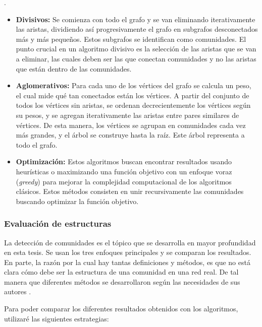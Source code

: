 \begin{enumerate}
.
\begin{itemize}
\item \textbf{Divisivos:} Se comienza con todo el grafo y se van eliminando iterativamente las aristas, dividiendo así progresivamente el grafo en subgrafos desconectados más y más pequeños. Estos subgrafos se identifican como comunidades. El punto crucial en un algoritmo divisivo es la selección de las aristas que se van a eliminar, las cuales deben ser las que conectan comunidades y no las aristas que están dentro de las comunidades. \cite{Radicchi2004DefiningNetworks,Girvan2002CommunityNetworks.,Newman2004FastNetworks}
\item \textbf{Aglomerativos:} Para cada uno de los vértices del grafo se calcula un peso, el cual mide qué tan conectados están los vértices. A partir del conjunto de todos los vértices sin aristas, se ordenan decrecientemente los vértices según su pesos, y se agregan iterativamente las aristas entre pares similares de vértices. De esta manera, los vértices se agrupan en comunidades cada vez más grandes, y el árbol se construye hasta la raíz. Este árbol representa a todo el grafo. \cite{Radicchi2004DefiningNetworks,Pons2005ComputingWalks}
\item \textbf{Optimización:} Estos algoritmos buscan encontrar resultados usando heurísticas o maximizando una función objetivo con un enfoque voraz (\textit{greedy}) para mejorar la complejidad computacional de los algoritmos clásicos. Estos métodos consisten en unir recursivamente las comunidades buscando optimizar la función objetivo.\cite{Clauset2004FindingNetworks,Blondel2008FastNetworks}
\end{itemize}
  
\end{enumerate}

\subsubsection{Evaluación de estructuras}
La detección de comunidades es el tópico que se desarrolla en mayor profundidad en esta tesis. Se usan los tres enfoques principales y se comparan los resultados. En parte, la razón por la cual hay tantas definiciones y métodos, es que no está clara cómo debe ser la estructura de una comunidad en una red real. De tal manera que diferentes métodos se desarrollaron según las necesidades de sus autores \cite{Tang2010}.

Para poder comparar los diferentes resultados obtenidos con los algoritmos, utilizaré las siguientes estrategias:

